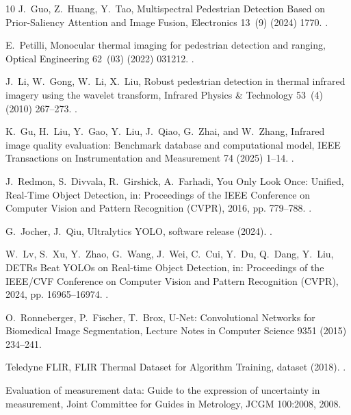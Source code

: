 \begin{thebibliography}{10}
J.~Guo, Z.~Huang, Y.~Tao, {Multispectral Pedestrian Detection Based on
  Prior-Saliency Attention and Image Fusion}, Electronics 13~(9) (2024) 1770.
\newblock \href {https://doi.org/10.3390/electronics13091770}
  {}.

E.~Petilli, {Monocular thermal imaging for pedestrian detection and ranging},
  Optical Engineering 62~(03) (2022) 031212.
\newblock \href {https://doi.org/10.1117/1.OE.62.3.031212}
  {}.

J.~Li, W.~Gong, W.~Li, X.~Liu, {Robust pedestrian detection in thermal infrared
  imagery using the wavelet transform}, Infrared Physics \& Technology 53~(4)
  (2010) 267--273.
\newblock \href {https://doi.org/10.1016/j.infrared.2010.03.005}
  {}.

K.~Gu, H.~Liu, Y.~Gao, Y.~Liu, J.~Qiao, G.~Zhai, and W.~Zhang, {Infrared image
  quality evaluation: Benchmark database and computational model}, IEEE
  Transactions on Instrumentation and Measurement 74 (2025) 1--14.
\newblock \href {https://doi.org/10.1109/TIM.2025.3544722}
  {}.

J.~Redmon, S.~Divvala, R.~Girshick, A.~Farhadi, {You Only Look Once: Unified,
  Real-Time Object Detection}, in: Proceedings of the IEEE Conference on
  Computer Vision and Pattern Recognition (CVPR), 2016, pp. 779--788.
\newblock \href {https://doi.org/10.1109/CVPR.2016.91}
  {}.

G.~Jocher, J.~Qiu, {Ultralytics YOLO}, software release (2024).
\newblock \href {https://github.com/ultralytics/ultralytics}
  {}.

W.~Lv, S.~Xu, Y.~Zhao, G.~Wang, J.~Wei, C.~Cui, Y.~Du, Q.~Dang, Y.~Liu,
  {DETRs Beat YOLOs on Real-time Object Detection}, in: Proceedings of the
  IEEE/CVF Conference on Computer Vision and Pattern Recognition (CVPR), 2024,
  pp. 16965--16974.
\newblock \href {https://doi.org/10.1109/CVPR52733.2024.01605}
  {}.

O.~Ronneberger, P.~Fischer, T.~Brox, {U-Net: Convolutional Networks for
  Biomedical Image Segmentation}, Lecture Notes in Computer Science 9351 (2015)
  234--241\newblock \href {https://doi.org/10.1007/978-3-319-24574-4_28}
  {}.

Teledyne FLIR, {FLIR Thermal Dataset for Algorithm Training}, dataset (2018).
\newblock \href {https://www.flir.com/oem/adas/adas-dataset-form/}
  {}.

{Evaluation of measurement data: Guide to the expression of uncertainty in
  measurement}, Joint Committee for Guides in Metrology, JCGM 100:2008, 2008.

\end{thebibliography}
